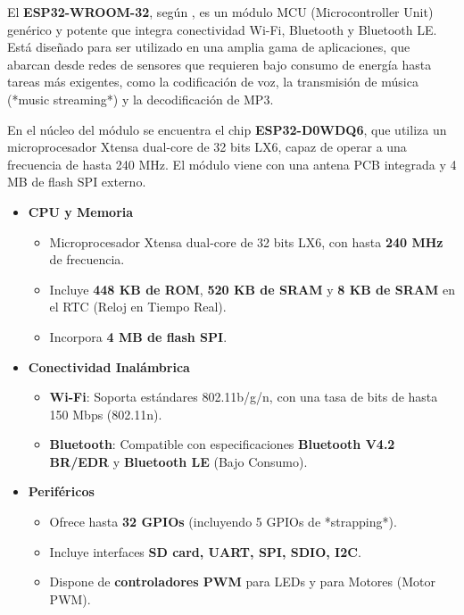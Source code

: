         El \textbf{ESP32-WROOM-32}, según \cite{esp32wroom32}, es un módulo MCU (Microcontroller Unit) genérico y potente que integra conectividad Wi-Fi, Bluetooth y Bluetooth LE. Está diseñado para ser utilizado en una amplia gama de aplicaciones, que abarcan desde redes de sensores que requieren bajo consumo de energía hasta tareas más exigentes, como la codificación de voz, la transmisión de música (*music streaming*) y la decodificación de MP3.

        En el núcleo del módulo se encuentra el chip \textbf{ESP32-D0WDQ6}, que utiliza un microprocesador Xtensa dual-core de 32 bits LX6, capaz de operar a una frecuencia de hasta 240 MHz. El módulo viene con una antena PCB integrada y 4 MB de flash SPI externo.

        \begin{itemize}
            \item \textbf{CPU y Memoria}
            \begin{itemize}
                \item Microprocesador Xtensa dual-core de 32 bits LX6, con hasta \textbf{240 MHz} de frecuencia.
                \item Incluye \textbf{448 KB de ROM}, \textbf{520 KB de SRAM} y \textbf{8 KB de SRAM} en el RTC (Reloj en Tiempo Real).
                \item Incorpora \textbf{4 MB de flash SPI}.
            \end{itemize}
            \item \textbf{Conectividad Inalámbrica}
            \begin{itemize}
                \item \textbf{Wi-Fi}: Soporta estándares 802.11b/g/n, con una tasa de bits de hasta 150 Mbps (802.11n).
                \item \textbf{Bluetooth}: Compatible con especificaciones \textbf{Bluetooth V4.2 BR/EDR} y \textbf{Bluetooth LE} (Bajo Consumo).
            \end{itemize}
            \item \textbf{Periféricos}
            \begin{itemize}
                \item Ofrece hasta \textbf{32 GPIOs} (incluyendo 5 GPIOs de *strapping*).
                \item Incluye interfaces \textbf{SD card, UART, SPI, SDIO, I2C}.
                \item Dispone de \textbf{controladores PWM} para LEDs y para Motores (Motor PWM).

\end{itemize}
\end{itemize}

